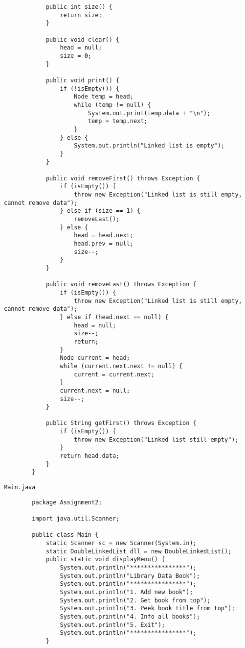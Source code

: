 \documentclass[12pt,titlepage]{article}
\begin{document}
\begin{enumerate}
\begin{verbatim}
            public int size() {
                return size;
            }

            public void clear() {
                head = null;
                size = 0;
            }

            public void print() {
                if (!isEmpty()) {
                    Node temp = head;
                    while (temp != null) {
                        System.out.print(temp.data + "\n");
                        temp = temp.next;
                    }
                } else {
                    System.out.println("Linked list is empty");
                }
            }

            public void removeFirst() throws Exception {
                if (isEmpty()) {
                    throw new Exception("Linked list is still empty, cannot remove data");
                } else if (size == 1) {
                    removeLast();
                } else {
                    head = head.next;
                    head.prev = null;
                    size--;
                }
            }

            public void removeLast() throws Exception {
                if (isEmpty()) {
                    throw new Exception("Linked list is still empty, cannot remove data");
                } else if (head.next == null) {
                    head = null;
                    size--;
                    return;
                } 
                Node current = head;
                while (current.next.next != null) {
                    current = current.next;
                }
                current.next = null;
                size--;
            }

            public String getFirst() throws Exception {
                if (isEmpty()) {
                    throw new Exception("Linked list still empty");
                }
                return head.data;
            }
        }
    \end{verbatim}
    \texttt{Main.java}
    \begin{verbatim}
        package Assignment2;

        import java.util.Scanner;

        public class Main {
            static Scanner sc = new Scanner(System.in);
            static DoubleLinkedList dll = new DoubleLinkedList();
            public static void displayMenu() {
                System.out.println("****************");
                System.out.println("Library Data Book");
                System.out.println("****************");
                System.out.println("1. Add new book");
                System.out.println("2. Get book from top");
                System.out.println("3. Peek book title from top");
                System.out.println("4. Info all books");
                System.out.println("5. Exit");
                System.out.println("****************");
            }
            

\end{verbatim}
\end{enumerate}
\end{document}
